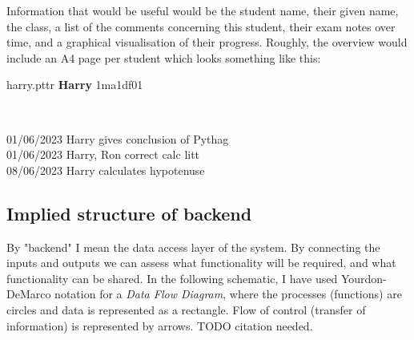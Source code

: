 \documentclass[10pt]{article}
\begin{document}
Information that would be useful would be the student name, their given name, the class, a list of the comments concerning this student, their exam notes over time, and a graphical visualisation of their progress. Roughly, the overview would include an A4 page per student which looks something like this:

\begin{center}
\begin{tcolorbox}

harry.pttr \hfill \textbf{Harry} \hfill 1ma1df01

\

\small{
01/06/2023 Harry gives conclusion of Pythag \\
01/06/2023 Harry, Ron correct calc litt \\
08/06/2023 Harry calculates hypotenuse
}

\vspace{10mm}

\begin{center}
\end{center}

\end{tcolorbox}
\end{center}


\subsection{Implied structure of backend}

By "backend" I mean the data access layer of the system. By connecting the inputs and outputs we can assess what functionality will be required, and what functionality can be shared. In the following schematic, I have used Yourdon-DeMarco notation for a \emph{Data Flow Diagram}, where the processes (functions) are circles and data is represented as a rectangle. Flow of control (transfer of information) is represented by arrows. TODO citation needed.
\end{document}
